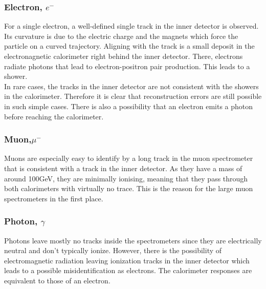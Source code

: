 \documentclass[twoside,        %
               BCOR12mm,       %
               ngerman,english, %
               fleqn,headsepline=false,footsepline=false
              ]{Vorlage/MFPREPORT}
\begin{document}
\subsubsection{Electron, $e^-$}
For a single electron, a well-defined single track in the inner detector is
observed. Its curvature is due to the electric charge and the magnets which
force the particle on a curved trajectory. Aligning with the track is a small
deposit in the electronagnetic calorimeter right behind the inner detector.
There, electrons radiate photons that lead to electron-positron pair
production. This leads to a shower.\\
In rare cases, the tracks in the inner detector are not consistent with the
showers in the calorimeter. Therefore it is clear that reconstruction errors
are still possible in such simple cases. There is also a possibility that an
electron emits a photon before reaching the calorimeter.

\subsubsection{Muon,$ \mu^-$}
Muons are especially easy to identify by a long track in the muon spectrometer
that is consistent with a track in the inner detector. As they have a mass of
around 100\;GeV, they are minimally ionising, meaning that they pass through
both calorimeters with virtually no trace. This is the reason for the large
muon spectrometers in the first place.

\subsubsection{Photon, $\gamma$}
Photons leave mostly no tracks inside the spectrometers since they are electrically
neutral and don't typically ionize. However, there is the possibility of
electromagnetic radiation leaving ionization tracks in the inner detector which
leads to a possible misidentification as electrons. The calorimeter responses
are equivalent to those of an electron.
\end{document}
